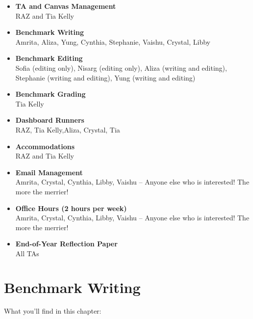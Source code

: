 \documentclass[
]{article}
\begin{document}
\begin{itemize}
\item
  \textbf{TA and Canvas Management}\\
  RAZ and Tia Kelly
\item
  \textbf{Benchmark Writing}\\
  Amrita, Aliza, Yung, Cynthia, Stephanie, Vaishu, Crystal, Libby
\item
  \textbf{Benchmark Editing}\\
  Sofia (editing only), Nisarg (editing only), Aliza (writing and editing), Stephanie (writing and editing), Yung (writing and editing)
\item
  \textbf{Benchmark Grading}\\
  Tia Kelly
\item
  \textbf{Dashboard Runners}\\
  RAZ, Tia Kelly,Aliza, Crystal, Tia
\item
  \textbf{Accommodations}\\
  RAZ and Tia Kelly
\item
  \textbf{Email Management}\\
  Amrita, Crystal, Cynthia, Libby, Vaishu -- Anyone else who is interested! The more the merrier!
\item
  \textbf{Office Hours (2 hours per week)}\\
  Amrita, Crystal, Cynthia, Libby, Vaishu -- Anyone else who is interested! The more the merrier!
\item
  \textbf{End-of-Year Reflection Paper}\\
  All TAs
\end{itemize}

\hypertarget{benchmark-writing}{%
\section{Benchmark Writing}\label{benchmark-writing}}

What you'll find in this chapter:
\end{document}
